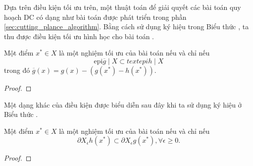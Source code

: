 \documentclass[a4paper]{report}
\begin{document}
    Dựa trên điều kiện tối ưu trên, một thuật toán để giải quyết các bài toán quy hoạch DC có dạng như bài toán  được phát triển trong phần \ref{sec:cutting_plance_algorithm}. Bằng cách sử dụng ký hiệu trong Biểu thức , ta thu được điều kiện tối ưu hình học cho bài toán .

    \begin{proposition}
        Một điểm $x^* \in X$ là một nghiệm tối ưu của bài toán  nếu và chỉ nếu
        \begin{equation}
            \label{eq:geometric_optim_cond_gh_convex}
            \text{epi}\overline{g} \mid X \subset text{epi}{h} \mid X
        \end{equation}
        trong đó $\overline{g}(x) = g(x) - (g(x^*) - h(x^*))$.
    \end{proposition}
    \begin{proof}
        
    \end{proof}

    Một dạng khác của điều kiện  được biểu diễn sau đây khi ta sử dụng ký hiệu ở Biểu thức .

    \begin{proposition}
        Một điểm $x^* \in X$ là một nghiệm tối ưu của bài toán  nếu và chỉ nếu
        \begin{equation}
            \label{eq:subgradient_optim_cond_gh_convex}
            \partial X_{\epsilon}h(x^*) \subset \partial X_{\epsilon}g(x^*), \forall \epsilon \geq 0.
        \end{equation}
    \end{proposition}
    \begin{proof}
        
    \end{proof}
\end{document}
